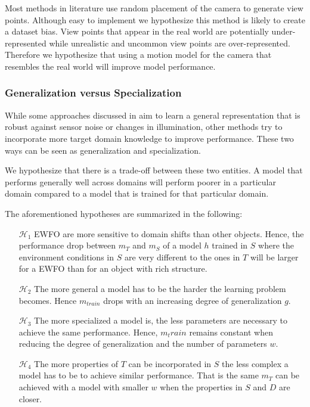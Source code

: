 Most methods in literature use random placement of the camera to generate view points. Although easy to implement we hypothesize this method is likely to create a dataset bias. View points that appear in the real world are potentially under-represented while unrealistic and uncommon view points are over-represented. Therefore we hypothesize that using a motion model for the camera that resembles the real world will improve model performance. 


\subsubsection{Generalization versus Specialization}
\label{sec:training:genvsspc}

While some approaches discussed in  aim to learn a general representation that is robust against sensor noise or changes in illumination, other methods try to incorporate more target domain knowledge to improve performance. These two ways can be seen as generalization and specialization.

We hypothesize that there is a trade-off between these two entities. A model that performs generally well across domains will perform poorer in a particular domain compared to a model that is trained for that particular domain.

The aforementioned hypotheses are summarized in the following:

\begin{enumerate}
	\item[$\mathcal{H}_1$] \ac{EWFO} are more sensitive to domain shifts than other objects. Hence, the performance drop between $m_T$ and $m_S$ of a model $h$ trained in $S$ where the environment conditions in $S$ are very different to the ones in $T$ will be larger for a \ac{EWFO} than for an object with rich structure.
	
	\item[$\mathcal{H}_2$] The more general a model has to be the harder the learning problem becomes. Hence $m_{train}$ drops with an increasing degree of generalization $g$.
	
	\item[$\mathcal{H}_3$] The more specialized a model is, the less parameters are necessary to achieve the same performance. Hence, $m_train$ remains constant when reducing the degree of generalization and the number of parameters $w$.
	
	\item[$\mathcal{H}_4$] The more properties of $T$ can be incorporated in $S$ the less complex a model has to be to achieve similar performance. That is the same $m_T$ can be achieved with a model with smaller $w$ when the properties in $S$ and $D$ are closer.
\end{enumerate}







